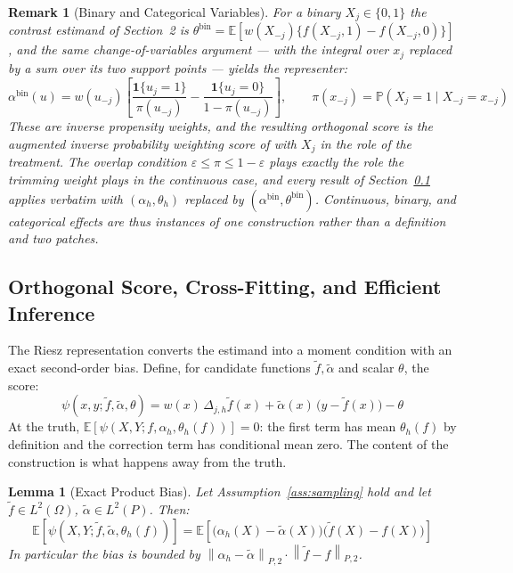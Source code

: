\documentclass[12pt]{article}
\newtheorem{lemma}{Lemma}
\newtheorem{remark}{Remark}
\newcommand{\norm}[1]{\left\| #1 \right\|}
\newcommand{\E}{\mathbb{E}}
\newcommand{\Prob}{\mathbb{P}}
\newcommand{\Dh}{\Delta_{j,h}}
\newcommand{\Ptwo}[1]{\norm{#1}_{P,2}}
\begin{document}
	\begin{remark}[Binary and Categorical Variables]
		\label{rem:binary}
		For a binary $X_j \in \{0,1\}$ the contrast estimand of Section~2 is
		$\theta^{\mathrm{bin}} = \E[w(X_{-j})\{f(X_{-j}, 1) - f(X_{-j}, 0)\}]$, and the
		same change-of-variables argument --- with the integral over $x_j$ replaced by a
		sum over its two support points --- yields the representer:
		\begin{equation}
			\alpha^{\mathrm{bin}}(u) = w(u_{-j})\left[
			\frac{\mathbf{1}\{u_j = 1\}}{\pi(u_{-j})}
			- \frac{\mathbf{1}\{u_j = 0\}}{1 - \pi(u_{-j})}\right],
			\qquad \pi(x_{-j}) = \Prob(X_j = 1 \mid X_{-j} = x_{-j})
		\end{equation}
		These are inverse propensity weights, and the resulting orthogonal score is the
		augmented inverse probability weighting score of \citet{robins1994} with $X_j$
		in the role of the treatment. The overlap condition
		$\varepsilon \leq \pi \leq 1 - \varepsilon$ plays exactly the role the trimming
		weight plays in the continuous case, and every result of
		Section~\ref{sec:inference} applies verbatim with
		$(\alpha_h, \theta_h)$ replaced by
		$(\alpha^{\mathrm{bin}}, \theta^{\mathrm{bin}})$. Continuous, binary, and
		categorical effects are thus instances of one construction rather than a
		definition and two patches.
	\end{remark}
	
	\subsection{Orthogonal Score, Cross-Fitting, and Efficient Inference}
	\label{sec:inference}
	
	The Riesz representation converts the estimand into a moment condition with an
	exact second-order bias. Define, for candidate functions
	$\tilde{f}, \tilde{\alpha}$ and scalar $\theta$, the score:
	\begin{equation}
		\psi(x, y; \tilde{f}, \tilde{\alpha}, \theta)
		= w(x)\, \Dh \tilde{f}(x)
		+ \tilde{\alpha}(x)\,\bigl(y - \tilde{f}(x)\bigr) - \theta
		\label{eq:score}
	\end{equation}
	At the truth, $\E[\psi(X, Y; f, \alpha_h, \theta_h(f))] = 0$: the first term has
	mean $\theta_h(f)$ by definition and the correction term has conditional mean zero.
	The content of the construction is what happens away from the truth.
	
	\begin{lemma}[Exact Product Bias]
		\label{lem:orth}
		Let Assumption~\ref{ass:sampling} hold and let
		$\tilde{f} \in L^2(\Omega)$, $\tilde{\alpha} \in L^2(P)$. Then:
		\begin{equation}
			\E\left[\psi(X, Y; \tilde{f}, \tilde{\alpha}, \theta_h(f))\right]
			= \E\left[\bigl(\alpha_h(X) - \tilde{\alpha}(X)\bigr)
			\bigl(\tilde{f}(X) - f(X)\bigr)\right]
		\end{equation}
		In particular the bias is bounded by
		$\Ptwo{\alpha_h - \tilde{\alpha}} \cdot \Ptwo{\tilde{f} - f}$.
	\end{lemma}
	
\end{document}
